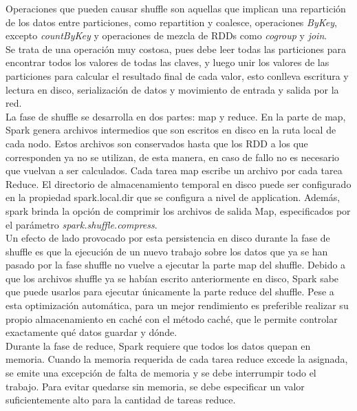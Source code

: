 Operaciones que pueden causar shuffle son aquellas que implican una repartición de los datos entre particiones, como repartition y coalesce, operaciones \textit{ByKey}, excepto  \textit{countByKey} y operaciones de mezcla de RDDs como \textit{cogroup} y \textit{join}.\\

Se trata de una operación muy costosa, pues debe leer todas las particiones para encontrar todos los valores de todas las claves, y luego unir los valores de las particiones para calcular el resultado final de cada valor, esto conlleva escritura y lectura en disco, serialización de datos y movimiento de entrada y salida por la red.\\

La fase de shuffle se desarrolla en dos partes: map y reduce. En la parte de map, Spark genera archivos intermedios que son escritos en disco en la ruta local de cada nodo. Estos archivos son conservados hasta que los RDD a los que corresponden ya no se utilizan, de esta manera, en caso de fallo no es necesario que vuelvan a ser calculados. Cada tarea map escribe un archivo por cada tarea Reduce. El directorio de almacenamiento temporal en disco puede ser configurado en la propiedad spark.local.dir que se configura a nivel de application. Además, spark brinda la opción de comprimir los archivos de salida Map, especificados por el parámetro \textit{spark.shuffle.compress}.\\

Un efecto de lado provocado por esta persistencia en disco durante la fase de shuffle es que la ejecución de un nuevo trabajo sobre los datos que ya se han pasado por la fase shuffle no vuelve a ejecutar la parte map del shuffle. Debido a que los archivos shuffle ya se habían escrito anteriormente en disco, Spark sabe que puede usarlos para ejecutar únicamente la parte reduce del shuffle. Pese a esta optimización automática,  para un mejor rendimiento es preferible realizar su propio almacenamiento en caché con el método caché, que le permite controlar exactamente qué datos guardar y dónde.\\

Durante la fase de reduce, Spark requiere que todos los datos quepan en memoria. Cuando la memoria requerida de cada tarea reduce excede la asignada, se emite una excepción de falta de memoria y se debe interrumpir todo el trabajo. Para evitar quedarse sin memoria, se debe especificar un valor suficientemente alto para la cantidad de tareas reduce.\\

